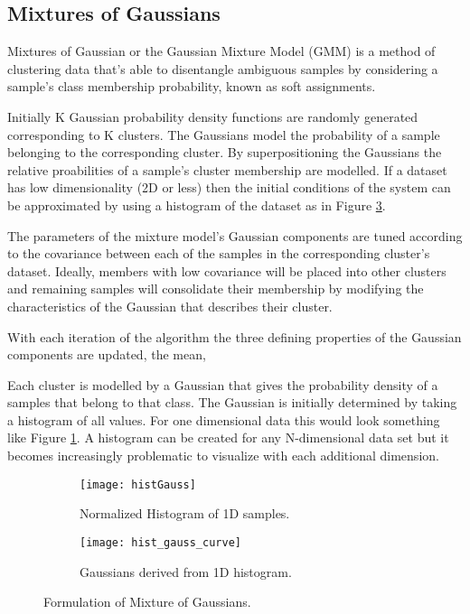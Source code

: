  \subsection{Mixtures of Gaussians}

Mixtures of Gaussian or the Gaussian Mixture Model (GMM) is a method of clustering data that's able to disentangle ambiguous samples by considering a sample's class membership probability, known as soft assignments. 

Initially K Gaussian probability density functions are randomly generated corresponding to K clusters. The Gaussians model the probability of a sample belonging to the corresponding cluster. By superpositioning the Gaussians the relative proabilities of a sample's cluster membership are modelled. If a dataset has low dimensionality (2D or less) then the initial conditions of the system can be approximated by using a histogram of the dataset as in Figure \ref{fig:mixture}.

The parameters of the mixture model's Gaussian components are tuned according to the covariance between each of the samples in the corresponding cluster's dataset. Ideally, members with low covariance will be placed into other clusters and remaining samples will consolidate their membership by modifying the characteristics of the Gaussian that describes their cluster.

With each iteration of the algorithm the three defining properties of the Gaussian components are updated, the mean, 

Each cluster is modelled by a Gaussian that gives the probability density of a samples that belong to that class. The Gaussian is initially determined by taking a histogram of all values. For one dimensional data this would look something like Figure \ref{fig:histGauss}. A histogram can be created for any N-dimensional data set but it becomes increasingly problematic to visualize with each additional dimension.

\begin{figure}[H]
	\centering
	\begin{subfigure}[b]{0.5\linewidth}
            \centering\texttt{[image: histGauss]}
      		\caption{Normalized Histogram of 1D samples.}
		\label{fig:histGauss}
    	\end{subfigure}%
    	\begin{subfigure}[b]{0.5\linewidth}
      		\centering\texttt{[image: hist\_gauss\_curve]}
      		\caption{Gaussians derived from 1D histogram. }
       		\label{fig:histCurve}
    	\end{subfigure}
    	\caption{Formulation of Mixture of Gaussians.}
    	\label{fig:mixture}
\end{figure}

